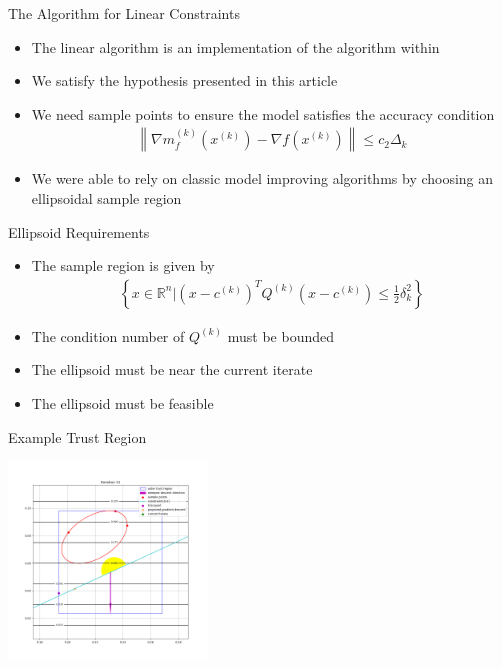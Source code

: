 \documentclass{beamer}
\newcommand{\Rn}{\mathbb R ^ {n}}
\begin{document}
\begin{frame}{The Algorithm for Linear Constraints}
	\begin{itemize}
		\item The linear algorithm is an implementation of the algorithm within \cite{CONEJO2013324}
		\item We satisfy the hypothesis presented in this article
		\item We need sample points to ensure the model satisfies the accuracy condition
\begin{align*}
		\left\|\nabla m_f^{(k)}\left(x^{(k)}\right) - \nabla f \left(x^{(k)}\right)\right\| \le c_2 \Delta_k
\end{align*}
		\item We were able to rely on classic model improving algorithms by choosing an ellipsoidal sample region
	\end{itemize}
\end{frame}


\begin{frame}{Ellipsoid Requirements}
	\begin{itemize}
		\setlength\itemsep{1.5em}
		\item The sample region is given by
\begin{align*}
\left\{x \in \Rn \bigg | \left(x - c^{(k)}\right)^TQ^{(k)}\left(x - c^{(k)}\right) \le \frac 1 2 \delta_k^2 \right\}
\end{align*}
		\item The condition number of $Q^{(k)}$ must be bounded
		\item The ellipsoid must be near the current iterate
		\item The ellipsoid must be feasible
	\end{itemize}
\end{frame}

\begin{frame}{Example Trust Region}
	\begin{center}
		\includegraphics[width=200px]{images/00068_iteration_11.png}
	\end{center}
\end{frame}
\end{document}
